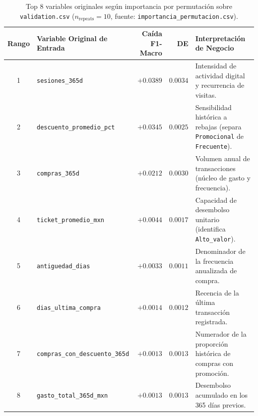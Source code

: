 \documentclass[11pt,a4paper]{article}
\newcommand{\code}[1]{\texttt{\small #1}}
\begin{document}
\begin{table}[H]
\centering
\caption{Top 8 variables originales según importancia por permutación sobre \code{validation.csv} ($n_{\text{repeats}}=10$, fuente: \code{importancia\_permutacion.csv}).}
\footnotesize
\setlength{\tabcolsep}{4pt}
\begin{tabularx}{\textwidth}{clrr >{\raggedright\arraybackslash}X}
\toprule
\textbf{Rango} & \textbf{Variable Original de Entrada} & \textbf{Caída F1-Macro} & \textbf{DE} & \textbf{Interpretación de Negocio} \\
\midrule
1 & \code{sesiones\_365d} & $+0.0389$ & $0.0034$ & Intensidad de actividad digital y recurrencia de visitas. \\
2 & \code{descuento\_promedio\_pct} & $+0.0345$ & $0.0025$ & Sensibilidad histórica a rebajas (separa \code{Promocional} de \code{Frecuente}). \\
3 & \code{compras\_365d} & $+0.0212$ & $0.0030$ & Volumen anual de transacciones (núcleo de gasto y frecuencia). \\
4 & \code{ticket\_promedio\_mxn} & $+0.0044$ & $0.0017$ & Capacidad de desembolso unitario (identifica \code{Alto\_valor}). \\
5 & \code{antiguedad\_dias} & $+0.0033$ & $0.0011$ & Denominador de la frecuencia anualizada de compra. \\
6 & \code{dias\_ultima\_compra} & $+0.0014$ & $0.0012$ & Recencia de la última transacción registrada. \\
7 & \code{compras\_con\_descuento\_365d} & $+0.0013$ & $0.0013$ & Numerador de la proporción histórica de compras con promoción. \\
8 & \code{gasto\_total\_365d\_mxn} & $+0.0013$ & $0.0013$ & Desembolso acumulado en los 365 días previos. \\
\bottomrule
\end{tabularx}
\end{table}
\end{document}
